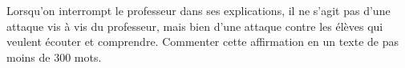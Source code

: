 
\begin{exercice}\label{exosmath-0460}

Lorsqu'on interrompt le professeur dans ses explications, il ne s'agit pas d'une attaque vis à vis du professeur, mais bien d'une attaque contre les élèves qui veulent écouter et comprendre. Commenter cette affirmation en un texte de pas moins de \( 300\) mots.

\end{exercice}
